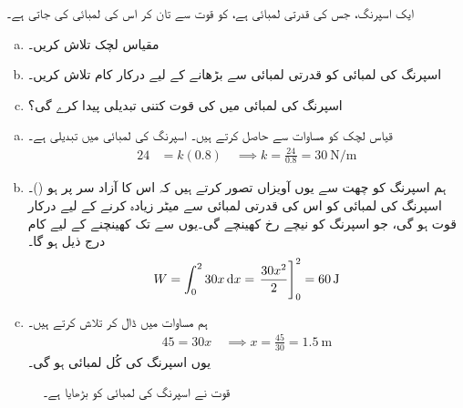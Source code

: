 ایک اسپرنگ، جس کی قدرتی لمبائی  ہے، کو  قوت سے تان کر  اس کی لمبائی   کی جاتی ہے۔
\begin{enumerate}[a.]
\item
مقیاس لچک  تلاش کریں۔
\item
اسپرنگ کی لمبائی کو  قدرتی لمبائی سے   بڑھانے کے لیے درکار کام تلاش کریں۔
\item
اسپرنگ کی لمبائی میں  کی قوت کتنی تبدیلی پیدا کرے گی؟ 
\end{enumerate}
\begin{enumerate}[a.]
\item
{}\quad
قیاس لچک کو مساوات  سے حاصل کرتے ہیں۔ اسپرنگ کی لمبائی میں تبدیلی  ہے۔
\begin{align*}
24&=k(0.8)\quad \implies k=\frac{24}{0.8}=\SI{30}{\newton\per\meter}
\end{align*}
\item
{}\quad
ہم اسپرنگ کو چھت سے یوں آویزاں تصور کرتے ہیں کہ اس کا آزاد سر  پر ہو ()۔اسپرنگ کی لمبائی کو اس کی  قدرتی لمبائی سے  میٹر زیادہ کرنے کے لیے درکار قوت  ہو گی، جو اسپرنگ کو نیچے رخ کھینچے گی۔یوں  سے  تک کھینچنے کے لیے کام درج ذیل ہو گا۔
\begin{align*}
W=\int_0^2 30x\dif x=\left.\frac{30x^2}{2}\right]_0^2=\SI{60}{\joule}
\end{align*}
\item
{}\quad
ہم مساوات  میں  ڈال کر  تلاش کرتے ہیں۔
\begin{align*}
45=30x\quad\implies x=\frac{45}{30}=\SI{1.5}{\meter} 
\end{align*}
یوں اسپرنگ کی کُل لمبائی  ہو گی۔
\end{enumerate}
\begin{figure}
\centering
{}
\caption{قوت نے اسپرنگ کی لمبائی کو بڑھایا ہے۔}
\label{شکل_مثال_تکمل_استعمال_تان_اسپرنگ_ب}
\end{figure}

